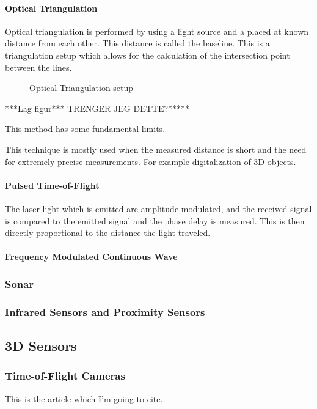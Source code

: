\paragraph{Optical Triangulation}
Optical triangulation is performed by using a light source and a placed at known distance
from each other. This distance is called the baseline. This is a triangulation setup which
allows for the calculation of the intersection point between the lines. 

\begin{figure}[htbp]
    \caption{Optical Triangulation setup}
    \label{fig:optical-triangulation}
\end{figure}
***Lag figur*** TRENGER JEG DETTE?*****

This method has some fundamental limits. \cite{laser-ranging-critical-review} 

This technique is mostly used when the measured distance is short and the need for
extremely precise measurements. For example digitalization of 3D objects.


\paragraph{Pulsed Time-of-Flight}
The laser light which is emitted are amplitude modulated, and the received signal is
compared to the emitted signal and the phase delay is measured. This is then directly
proportional to the distance the light traveled. 


\paragraph{Frequency Modulated Continuous Wave}


\subsubsection{Sonar}


\subsubsection{Infrared Sensors and Proximity Sensors}


\subsection{3D Sensors}


\subsubsection{Time-of-Flight Cameras}
This is the article which I'm going to cite. \cite{sr3000}



